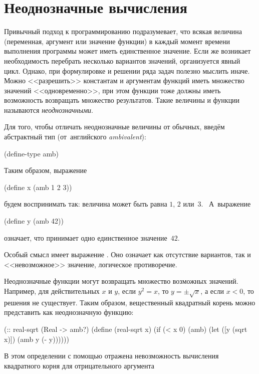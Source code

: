 
\section{Неоднозначные вычисления}%
Привычный подход к программированию подразумевает, что всякая величина (переменная, аргумент или значение функции) в каждый момент времени выполнения программы может иметь единственное значение. Если же возникает необходимость перебрать несколько вариантов значений, организуется явный цикл.
Однако, при формулировке и решении ряда задач полезно мыслить иначе. Можно <<разрешить>> константам и аргументам функций иметь множество значений <<одновременно>>, при этом функции тоже должны иметь возможность возвращать множество результатов. Такие величины и функции называются \emph{неоднозначными}.

Для того, чтобы отличать неоднозначные величины от обычных, введём абстрактный тип  (от~английского \emph{ambivalent}):\smallskip
\begin{SchemeCode}
(define-type amb)
\end{SchemeCode}\smallskip
Таким образом, выражение
\begin{SchemeCode}
(define x (amb 1 2 3))
\end{SchemeCode}
будем воспринимать так: величина  может быть равна $1$, $2$ или~$3$.~ А~выражение
\begin{SchemeCode}
(define y (amb 42))
\end{SchemeCode}
означает, что  принимает одно единственное значение~$42$.

Особый смысл имеет выражение . Оно означает как отсутствие вариантов, так и <<невозможное>> значение, логическое противоречие.

Неоднозначные функции могут возвращать множество возможных значений.
Например, для действительных $x$ и $y$, если $y^2 = x$, то $y = \pm\sqrt{x}$, а если $x<0$, то решения не существует. Таким образом, вещественный квадратный корень можно представить как неоднозначную функцию:
\label{n-sqrt}%
\begin{SchemeCode}
(:: real-sqrt (Real -> amb?)
  (define (real-sqrt x)
    (if (< x 0)
        (amb)
        (let ([y (sqrt x)]) 
          (amb y (- y))))))
\end{SchemeCode}
В этом определении с помощью  отражена невозможность вычисления  квадратного корня для отрицательного аргумента

